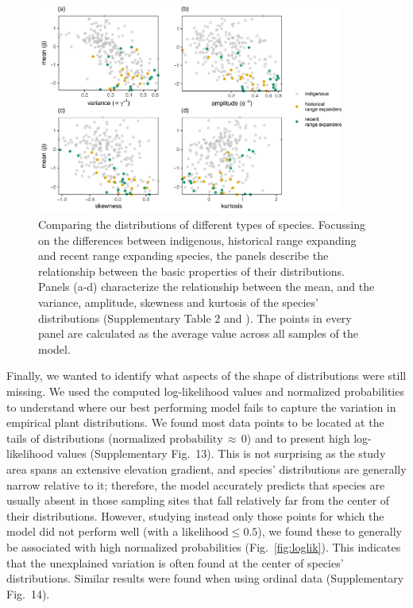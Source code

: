 \documentclass[11pt, a4paper]{article}
\begin{document}
\begin{figure}[ht]
  \centering
    \includegraphics[width=0.9\textwidth]{figures/figure3}
    	  \vspace{0.1cm}
	   \caption{Comparing the distributions of different types of species. Focussing on the differences between indigenous, historical range expanding and recent range expanding species, the panels describe the relationship between the basic properties of their distributions. Panels (a-d) characterize the relationship between the mean, and the variance, amplitude, skewness and kurtosis of the species' distributions (Supplementary Table 2 and \citealt{kermanSkewnessKurtosisBounds2013}). The points in every panel are calculated as the average value across all samples of the model. %
	   }
      \label{fig:pairwise}
\end{figure}

Finally, we wanted to identify what aspects of the shape of distributions were still missing. We used the computed log-likelihood values and normalized probabilities to understand where our best performing model fails to capture the variation in empirical plant distributions. We found most data points to be located at the tails of distributions ($\text{normalized probability}\,\approx\,0$) and to present high log-likelihood values (Supplementary Fig.~13). This is not surprising as the study area spans an extensive elevation gradient, and species' distributions are generally narrow relative to it; therefore, the model accurately predicts that species are usually absent in those sampling sites that fall relatively far from the center of their distributions. However, studying instead only those points for which the model did not perform well (with a $\text{likelihood}\leq 0.5$), we found these to generally be associated with high normalized probabilities (Fig.~\ref{fig:loglik}). This indicates that the unexplained variation is often found at the center of species' distributions. Similar results were found when using ordinal data (Supplementary Fig.~14).
\end{document}
